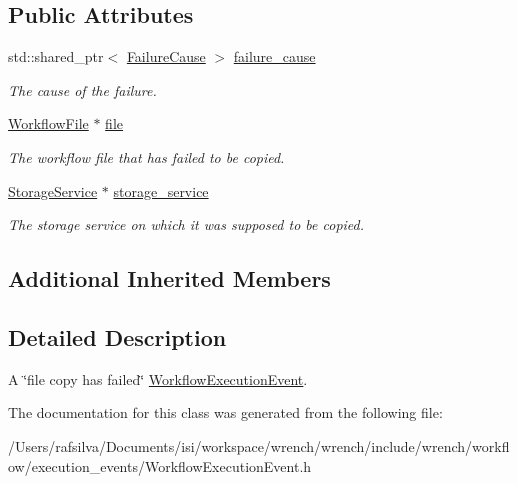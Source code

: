 \subsection*{Public Attributes}
\begin{DoxyCompactItemize}
\item 
\mbox{\label{classwrench_1_1_file_copy_failed_event_a8d3e5e8ce73f3ac145eb5046e0e79833}} 
std\+::shared\+\_\+ptr$<$ \hyperlink{classwrench_1_1_failure_cause}{Failure\+Cause} $>$ \hyperlink{classwrench_1_1_file_copy_failed_event_a8d3e5e8ce73f3ac145eb5046e0e79833}{failure\+\_\+cause}
\begin{DoxyCompactList}\small\item\em The cause of the failure. \end{DoxyCompactList}\item 
\mbox{\label{classwrench_1_1_file_copy_failed_event_ab15883f629da5271f8cb3f0e2add0345}} 
\hyperlink{classwrench_1_1_workflow_file}{Workflow\+File} $\ast$ \hyperlink{classwrench_1_1_file_copy_failed_event_ab15883f629da5271f8cb3f0e2add0345}{file}
\begin{DoxyCompactList}\small\item\em The workflow file that has failed to be copied. \end{DoxyCompactList}\item 
\mbox{\label{classwrench_1_1_file_copy_failed_event_ae24d988402fcdd2d3d114d2f1787096e}} 
\hyperlink{classwrench_1_1_storage_service}{Storage\+Service} $\ast$ \hyperlink{classwrench_1_1_file_copy_failed_event_ae24d988402fcdd2d3d114d2f1787096e}{storage\+\_\+service}
\begin{DoxyCompactList}\small\item\em The storage service on which it was supposed to be copied. \end{DoxyCompactList}\end{DoxyCompactItemize}
\subsection*{Additional Inherited Members}


\subsection{Detailed Description}
A \char`\"{}file copy has failed\char`\"{} \hyperlink{classwrench_1_1_workflow_execution_event}{Workflow\+Execution\+Event}. 

The documentation for this class was generated from the following file\+:\begin{DoxyCompactItemize}
\item 
/\+Users/rafsilva/\+Documents/isi/workspace/wrench/wrench/include/wrench/workflow/execution\+\_\+events/Workflow\+Execution\+Event.\+h\end{DoxyCompactItemize}
